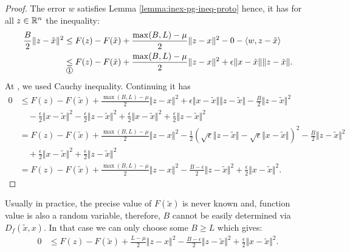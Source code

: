 \documentclass[12pt]{article}
\begin{document}
        \begin{proof}
            The error $w$ satisfies Lemma \ref{lemma:inex-pg-ineq-proto} hence, it has for all $z \in \mathbb R^n$ the inequality: 
            \begin{align*}
                \frac{B}{2}\Vert z - \tilde x\Vert^2
                &\le F(z) - F(\tilde x) + \frac{\max(B, L) - \mu}{2}\Vert z - x\Vert^2 - 0 - \langle w, z - \tilde x \rangle
                \\
                &\underset{\text{\circled{1}}}{\le}
                F(z) - F(\tilde x) + \frac{\max(B, L) - \mu}{2}\Vert z - x\Vert^2 + \epsilon \Vert x - \tilde x\Vert\Vert z - \tilde x\Vert. 
            \end{align*}
            At , we used Cauchy inequality. 
            Continuing it has 
            \begin{align*}
                0 &\le 
                F(z) - F(\tilde x) + \frac{\max(B, L) - \mu}{2}\Vert z - x\Vert^2
                + \epsilon \Vert x - \tilde x\Vert\Vert z - \tilde x\Vert 
                - \frac{B}{2}\Vert z - \tilde x\Vert^2
                    \\&\quad 
                    - \frac{\epsilon}{2}\Vert x - \tilde x\Vert^2 - \frac{\epsilon}{2}\Vert z - \tilde x \Vert^2
                    + \frac{\epsilon}{2}\Vert x - \tilde x\Vert^2 + \frac{\epsilon}{2}\Vert z - \tilde x \Vert^2
                \\
                &= F(z) - F(\tilde x) + \frac{\max(B, L) - \mu}{2}\Vert z - x\Vert^2
                - \frac{1}{2}\left(
                    \sqrt{\epsilon}\Vert z - \tilde x\Vert - \sqrt{\epsilon}\Vert x - \tilde x\Vert
                \right)^2
                - \frac{B}{2}\Vert z - \tilde x\Vert^2
                    \\
                    &\quad 
                    + \frac{\epsilon}{2}\Vert x - \tilde x\Vert^2 + \frac{\epsilon}{2}\Vert z - \tilde x \Vert^2
                \\
                &= F(z) - F(\tilde x) + \frac{\max(B, L) - \mu}{2}\Vert z - x\Vert^2
                - \frac{B - \epsilon}{2}\Vert z - \tilde x\Vert^2
                + \frac{\epsilon}{2}\Vert x - \tilde x \Vert^2. 
            \end{align*}
        \end{proof}
        \begin{remark}
            Usually in practice, the precise value of $F(\tilde x)$ is never known and, function value is also a random variable, therefore, $B$ cannot be easily determined via $D_f(\tilde x, x)$. 
            In that case we can only choose some $B \ge L$ which gives: 
            \begin{align*}
                0 &\le 
                F(z) - F(\tilde x) + \frac{L - \mu}{2}\Vert z - x\Vert^2
                - \frac{B - \epsilon}{2}\Vert z - \tilde x\Vert^2
                + \frac{\epsilon}{2}\Vert x - \tilde x \Vert^2.
            \end{align*}
        \end{remark}
\end{document}
